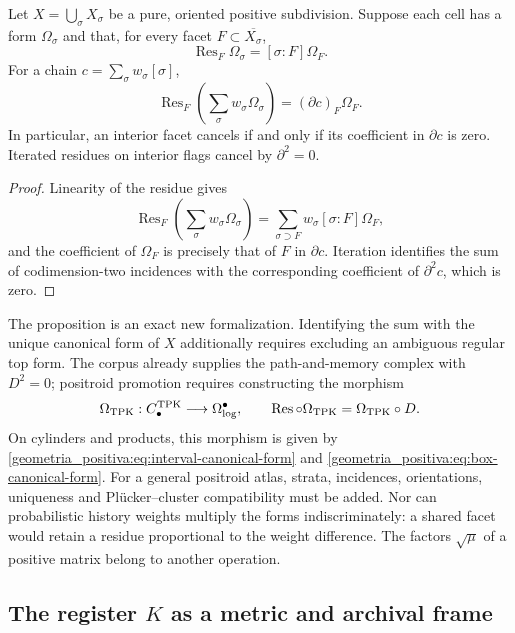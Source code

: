 \begin{proposition}
\label{geometria_positiva:prop:oriented-residue-chain} Let \(X=\bigcup_\sigma X_\sigma\) be a pure, oriented positive subdivision. Suppose each cell has a form \(\Omega_\sigma\) and that, for every facet \(F\subset\overline{X_\sigma}\),
\[
\operatorname{Res}_F\Omega_\sigma=[\sigma:F]\Omega_F.
\]
For a chain \(c=\sum_\sigma w_\sigma[\sigma]\),
\begin{equation}
\operatorname{Res}_F\!\left(\sum_\sigma w_\sigma\Omega_\sigma\right)
=(\partial c)_F\Omega_F.
\label{geometria_positiva:eq:residue-chain-map}
\end{equation}
In particular, an interior facet cancels if and only if its coefficient in \(\partial c\) is zero. Iterated residues on interior flags cancel by \(\partial^2=0\).
\end{proposition}
\begin{proof}
Linearity of the residue gives
\[
\operatorname{Res}_F\!\left(\sum_\sigma w_\sigma\Omega_\sigma\right)
=\sum_{\sigma\supset F}w_\sigma[\sigma:F]\Omega_F,
\]
and the coefficient of \(\Omega_F\) is precisely that of \(F\) in \(\partial c\). Iteration identifies the sum of codimension-two incidences with the corresponding coefficient of \(\partial^2c\), which is zero.
\end{proof}

The proposition is an exact new formalization. Identifying the sum with the unique canonical form of \(X\) additionally requires excluding an ambiguous regular top form. The corpus already supplies the path-and-memory complex with \(D^2=0\); positroid promotion requires constructing the morphism
\[
\Omega_{\rm TPK}:C_\bullet^{\rm TPK}\longrightarrow
\Omega^\bullet_{\log},
\qquad
\operatorname{Res}\circ\Omega_{\rm TPK}
=\Omega_{\rm TPK}\circ D.
\]
On cylinders and products, this morphism is given by \eqref{geometria_positiva:eq:interval-canonical-form} and \eqref{geometria_positiva:eq:box-canonical-form}. For a general positroid atlas, strata, incidences, orientations, uniqueness and Plücker--cluster compatibility must be added. Nor can probabilistic history weights multiply the forms indiscriminately: a shared facet would retain a residue proportional to the weight difference. The factors \(\sqrt\mu\) of a positive matrix belong to another operation.

\subsection{The register \(K\) as a metric and archival frame}

